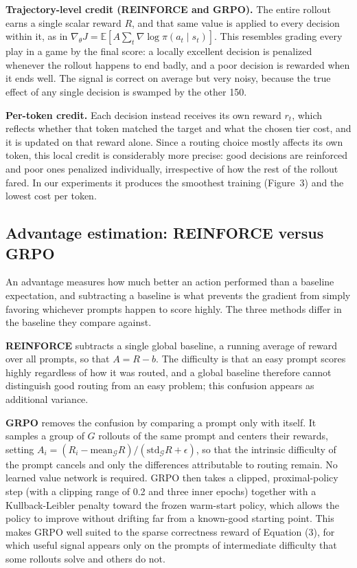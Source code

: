 \documentclass[11pt]{article}
\begin{document}
\textbf{Trajectory-level credit (REINFORCE and GRPO).} The entire rollout earns a single scalar reward
$R$, and that same value is applied to every decision within it, as in
$\nabla_\theta J=\mathbb{E}[A\sum_t\nabla\log\pi(a_t\mid s_t)]$. This resembles grading every play in a
game by the final score: a locally excellent decision is penalized whenever the rollout happens to end
badly, and a poor decision is rewarded when it ends well. The signal is correct on average but very
noisy, because the true effect of any single decision is swamped by the other 150.

\textbf{Per-token credit.} Each decision instead receives its own reward $r_t$, which reflects whether
that token matched the target and what the chosen tier cost, and it is updated on that reward alone.
Since a routing choice mostly affects its own token, this local credit is considerably more precise:
good decisions are reinforced and poor ones penalized individually, irrespective of how the rest of the
rollout fared. In our experiments it produces the smoothest training (Figure~3) and the lowest cost per
token.

\subsection{Advantage estimation: REINFORCE versus GRPO}
An advantage measures how much better an action performed than a baseline expectation, and subtracting
a baseline is what prevents the gradient from simply favoring whichever prompts happen to score highly.
The three methods differ in the baseline they compare against.

\textbf{REINFORCE} subtracts a single global baseline, a running average of reward over all prompts, so
that $A=R-b$. The difficulty is that an easy prompt scores highly regardless of how it was routed, and
a global baseline therefore cannot distinguish good routing from an easy problem; this confusion appears
as additional variance.

\textbf{GRPO} removes the confusion by comparing a prompt only with itself. It samples a group of $G$
rollouts of the same prompt and centers their rewards, setting
$A_i=(R_i-\mathrm{mean}_{\mathcal G}R)/(\mathrm{std}_{\mathcal G}R+\epsilon)$, so that the intrinsic
difficulty of the prompt cancels and only the differences attributable to routing remain. No learned
value network is required. GRPO then takes a clipped, proximal-policy step (with a clipping range of
0.2 and three inner epochs) together with a Kullback-Leibler penalty toward the frozen warm-start
policy, which allows the policy to improve without drifting far from a known-good starting point. This
makes GRPO well suited to the sparse correctness reward of Equation (3), for which useful signal
appears only on the prompts of intermediate difficulty that some rollouts solve and others do not.
\end{document}
